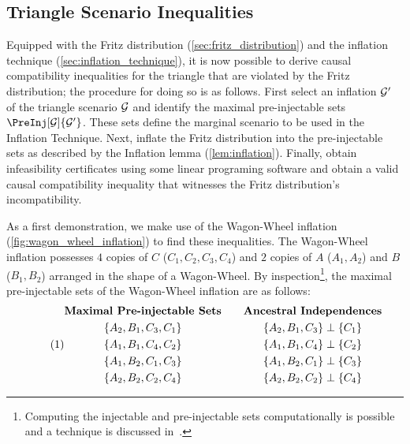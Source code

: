 \documentclass[aps, 10pt, english, twoside, pra, nofootinbib, tightenlines, longbibliography]{revtex4-1}
\begin{document}
    \subsection{Triangle Scenario Inequalities}
    \label{sec:found_inequalities}

    Equipped with the Fritz distribution (\cref{sec:fritz_distribution}) and the inflation technique (\cref{sec:inflation_technique}), it is now possible to derive causal compatibility inequalities for the triangle that are violated by the Fritz distribution; the procedure for doing so is as follows. First select an inflation $\mathcal{G}'$ of the triangle scenario $\mathcal{G}$ and identify the maximal pre-injectable sets $\PreInj[\graph]{\graph'}$. These sets define the marginal scenario to be used in the Inflation Technique. Next, inflate the Fritz distribution into the pre-injectable sets as described by the Inflation lemma (\cref{lem:inflation}). Finally, obtain infeasibility certificates using some linear programing software and obtain a valid causal compatibility inequality that witnesses the Fritz distribution's incompatibility.

    As a first demonstration, we make use of the Wagon-Wheel inflation (\cref{fig:wagon_wheel_inflation}) to find these inequalities. The Wagon-Wheel inflation possesses $4$ copies of $C$ ($C_1, C_2, C_3, C_4$) and $2$ copies of $A$ ($A_1, A_2$) and $B$ ($B_1, B_2$) arranged in the shape of a Wagon-Wheel. By inspection\footnote{Computing the injectable and pre-injectable sets computationally is possible and a technique is discussed in~\citet{Inflation}.}, the maximal pre-injectable sets of the Wagon-Wheel inflation are as follows:
    \begin{equation*}
        \eq \label{eq:pre_injectable_triangle_scenario_wagon_wheel}
        \begin{gathered}
            \textbf{Maximal Pre-injectable Sets} \\
            \bc{A_2, B_1, C_3, C_1} \\
            \bc{A_1, B_1, C_4, C_2} \\
            \bc{A_1, B_2, C_1, C_3} \\
            \bc{A_2, B_2, C_2, C_4} \\
        \end{gathered}
        \qquad
        \begin{gathered}
            \textbf{Ancestral Independences} \\
            \bc{A_2, B_1, C_3} \ancestralindep \bc{C_1} \\
            \bc{A_1, B_1, C_4} \ancestralindep \bc{C_2} \\
            \bc{A_1, B_2, C_1} \ancestralindep \bc{C_3} \\
            \bc{A_2, B_2, C_2} \ancestralindep \bc{C_4} \\
        \end{gathered}
    \end{equation*}
\end{document}
